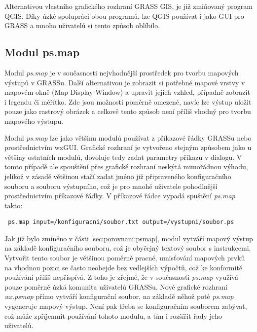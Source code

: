 \documentclass[a4paper,12pt,draft]{article}
\newcommand{\modul}[1]{\emph{#1}}
\begin{document}
Alternativou vlastního grafického rozhraní GRASS GIS, je již zmiňovaný
program QGIS. Díky úzké spolupráci obou programů, lze QGIS používat i jako GUI
pro GRASS a mnoho uživatelů si tento způsob oblíbilo.

\subsection{Modul ps.map}
\label{sec:psmap}
Modul \modul{ps.map} je v současnosti nejvhodnější prostředek pro tvorbu
mapových výstupů v GRASSu. Další alternativou je zobrazit si potřebné
mapové vrstvy v mapovém okně (Map Display Window)  a upravit jejich vzhled,
případně zobrazit i legendu či měřítko. Zde jsou možnosti poměrně
omezené, navíc lze výstup uložit pouze jako rastrový obrázek a celkově
tento způsob není příliš vhodný pro tvorbu mapového výstupu.

Modul \modul{ps.map} lze jako většinu modulů používat z příkazové
řádky GRASSu nebo pro\-střed\-nic\-tvím wxGUI. Grafické rozhraní
je vytvořeno stejným způsobem jako u většiny ostatních modulů,
dovoluje tedy zadat parametry příkazu v dialogu. V tomto případě ale
spouštění přes grafické rozhraní neskýtá mimořádnou výhodu,
jelikož v zásadě většinou stačí zadat jméno již připraveného
konfiguračního souboru a souboru výstupního, což je pro mnohé uživatele
pohodlnější prostřednictvím příkazové řádky. V příkazové řádce
vypadá spuštění \modul{ps.map} takto:
\begin{verbatim}
 ps.map input=/konfiguracni/soubor.txt output=/vystupni/soubor.ps
\end{verbatim}

Jak již bylo zmíněno v části \ref{sec:porovnani:psmap}, modul vytváří
mapový výstup na základě konfiguračního souboru, což je obyčejný
textový soubor s instrukcemi. Vytvořit tento soubor je většinou poměrně
pracné, umisťování mapových prvků na vhodnou pozici se často neobejde
bez vedlejších výpočtů, což ke konformitě používání příliš
nepřispívá. Z toho je zřejmé, že v současnosti \modul{ps.map} využívá
pouze poměrně úzká komunita uživatelů GRASSu. Nové grafické rozhraní
\emph{wx.psmap} přímo vytváří konfigurační soubor, na základě
něhož poté \modul{ps.map} vygeneruje mapový výstup. Není pak třeba
se konfiguračním souborem zabývat, což může zpříjemnit používání
tohoto modulu, a tím i rozšířit řady jeho uživatelů.
\end{document}
